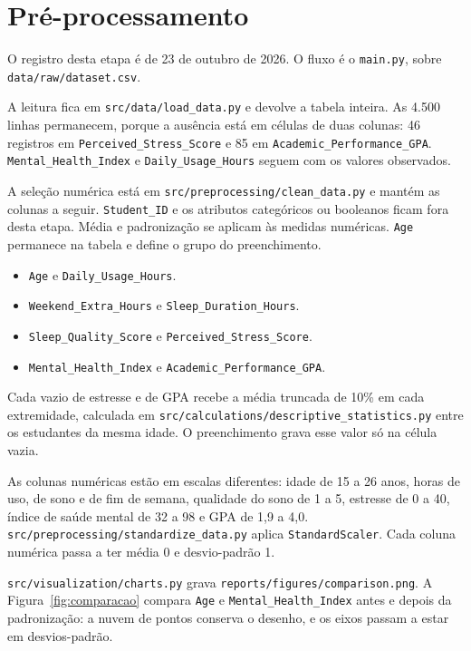 \documentclass[
  article,
  12pt,
  oneside,
  a4paper,
  english,
  brazil,
  chapter=TITLE,
  section=TITLE,
  subsection=TITLE
]{abntex2}
\begin{document}
\section{Pré-processamento}

O registro desta etapa é de 23 de outubro de 2026. O fluxo é o \texttt{main.py}, sobre \texttt{data/raw/}\allowbreak\texttt{dataset.csv}.

A leitura fica em \texttt{src/data/}\allowbreak\texttt{load\_data.py} e devolve a tabela inteira. As 4.500 linhas permanecem, porque a ausência está em células de duas colunas: 46 registros em \texttt{Perceived\_Stress\_Score} e 85 em \texttt{Academic\_Performance\_GPA}. \texttt{Mental\_Health\_Index} e \texttt{Daily\_Usage\_Hours} seguem com os valores observados.

A seleção numérica está em \texttt{src/preprocessing/}\allowbreak\texttt{clean\_data.py} e mantém as colunas a seguir. \texttt{Student\_ID} e os atributos categóricos ou booleanos ficam fora desta etapa. Média e padronização se aplicam às medidas numéricas. \texttt{Age} permanece na tabela e define o grupo do preenchimento.

\begin{itemize}[topsep=4pt,itemsep=1pt,parsep=0pt]
  \item \texttt{Age} e \texttt{Daily\_Usage\_Hours}.
  \item \texttt{Weekend\_Extra\_Hours} e \texttt{Sleep\_Duration\_Hours}.
  \item \texttt{Sleep\_Quality\_Score} e \texttt{Perceived\_Stress\_Score}.
  \item \texttt{Mental\_Health\_Index} e \texttt{Academic\_Performance\_GPA}.
\end{itemize}

Cada vazio de estresse e de GPA recebe a média truncada de 10\% em cada extremidade, calculada em \texttt{src/calculations/}\allowbreak\texttt{descriptive\_statistics.py} entre os estudantes da mesma idade. O preenchimento grava esse valor só na célula vazia.

As colunas numéricas estão em escalas diferentes: idade de 15 a 26 anos, horas de uso, de sono e de fim de semana, qualidade do sono de 1 a 5, estresse de 0 a 40, índice de saúde mental de 32 a 98 e GPA de 1,9 a 4,0. \texttt{src/preprocessing/}\allowbreak\texttt{standardize\_data.py} aplica \texttt{StandardScaler}. Cada coluna numérica passa a ter média 0 e desvio-padrão 1.

\texttt{src/visualization/}\allowbreak\texttt{charts.py} grava \texttt{reports/figures/}\allowbreak\texttt{comparison.png}. A \mbox{Figura~\ref{fig:comparacao}} compara \texttt{Age} e \texttt{Mental\_Health\_Index} antes e depois da padronização: a nuvem de pontos conserva o desenho, e os eixos passam a estar em desvios-padrão.
\end{document}
